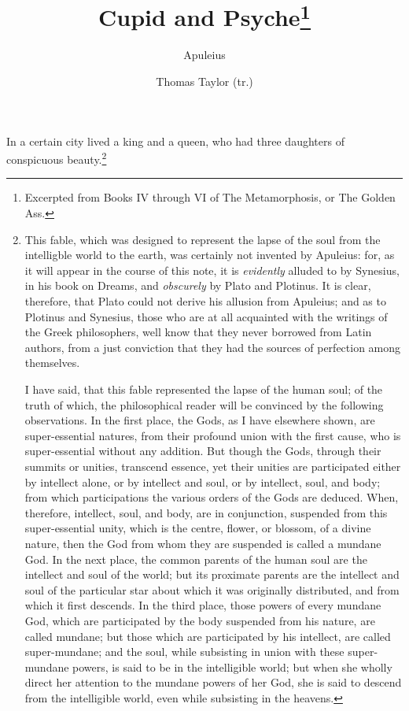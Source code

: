 \documentclass[12pt]{article}
\title{Cupid and Psyche\footnote{Excerpted from Books IV through VI of The
Metamorphosis, or The Golden Ass.}}
\author{Apuleius \and Thomas Taylor (tr.)}
\date{}
\begin{document}
\maketitle

\noindent In a certain city lived a king and a queen, who had three daughters
of conspicuous beauty.\footnote{This fable, which was designed to represent the
lapse of the soul from the intelligble world to the earth, was certainly not
invented by Apuleius: for, as it will appear in the course of this note, it is
\textit{evidently} alluded to by Synesius, in his book on Dreams, and
\textit{obscurely} by Plato and Plotinus. It is clear, therefore, that Plato
could not derive his allusion from Apuleius; and as to Plotinus and Synesius,
those who are at all acquainted with the writings of the Greek philosophers,
well know that they never borrowed from Latin authors, from a just conviction
that they had the sources of perfection among themselves.

I have said, that this fable represented the lapse of the human soul; of the
truth of which, the philosophical reader will be convinced by the following
observations. In the first place, the Gods, as I have elsewhere shown, are
super-essential natures, from their profound union with the first cause, who is
super-essential without any addition. But though the Gods, through their
summits or unities, transcend essence, yet their unities are participated
either by intellect alone, or by intellect and soul, or by intellect, soul, and
body; from which participations the various orders of the Gods are deduced.
When, therefore, intellect, soul, and body, are in conjunction, suspended from
this super-essential unity, which is the centre, flower, or blossom, of a
divine nature, then the God from whom they are suspended is called a mundane
God. In the next place, the common parents of the human soul are the intellect
and soul of the world; but its proximate parents are the intellect and soul of
the particular star about which it was originally distributed, and from which
it first descends. In the third place, those powers of every mundane God, which
are participated by the body suspended from his nature, are called mundane; but
those which are participated by his intellect, are called super-mundane; and
the soul, while subsisting in union with these super-mundane powers, is said to
be in the intelligible world; but when she wholly direct her attention to the
mundane powers of her God, she is said to descend from the intelligible world,
even while subsisting in the heavens.

}
\end{document}
